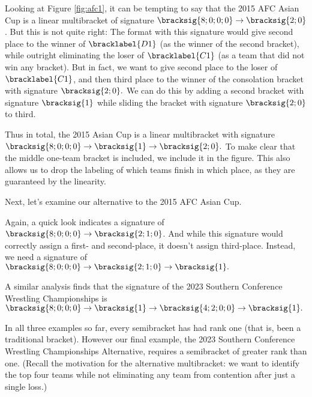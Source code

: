 {    Looking at Figure \ref{fig:afc1}, it can be tempting to say that the 2015 AFC Asian Cup is a linear multibracket of signature $\bracksig{8;0;0;0} \to \bracksig{2;0}$. But this is not quite right: The format with this signature would give second place to the winner of $\bracklabel{D1}$ (as the winner of the second bracket), while outright eliminating the loser of $\bracklabel{C1}$ (as a team that did not win any bracket). But in fact, we want to give second place to the loser of $\bracklabel{C1}$, and then third place to the winner of the consolation bracket with signature $\bracksig{2;0}.$ We can do this by adding a second bracket with signature $\bracksig{1}$ while sliding the bracket with signature $\bracksig{2;0}$ to third.

    Thus in total, the 2015 Asian Cup is a linear multibracket with signature $\bracksig{8;0;0;0} \to \bracksig{1} \to \bracksig{2;0}.$ To make clear that the middle one-team bracket is included, we include it in the figure. This also allows us to drop the labeling of which teams finish in which place, as they are guaranteed by the linearity.


    Next, let's examine our alternative to the 2015 AFC Asian Cup.


    Again, a quick look indicates a signature of $\bracksig{8;0;0;0} \to \bracksig{2;1;0}$. And while this signature would correctly assign a first- and second-place, it doesn't assign third-place. Instead, we need a signature of $\bracksig{8;0;0;0} \to \bracksig{2;1;0} \to \bracksig{1}.$


    A similar analysis finds that the signature of the 2023 Southern Conference Wrestling Championships \cite{wiki_socon} is $\bracksig{8;0;0;0} \to \bracksig{1} \to \bracksig{4;2;0;0} \to \bracksig{1}.$


    In all three examples so far, every semibracket has had rank one (that is, been a traditional bracket). However our final example, the 2023 Southern Conference Wrestling Championships Alternative, requires a semibracket of greater rank than one. (Recall the motivation for the alternative multibracket: we want to identify the top four teams while not eliminating any team from contention after just a single loss.)

}
